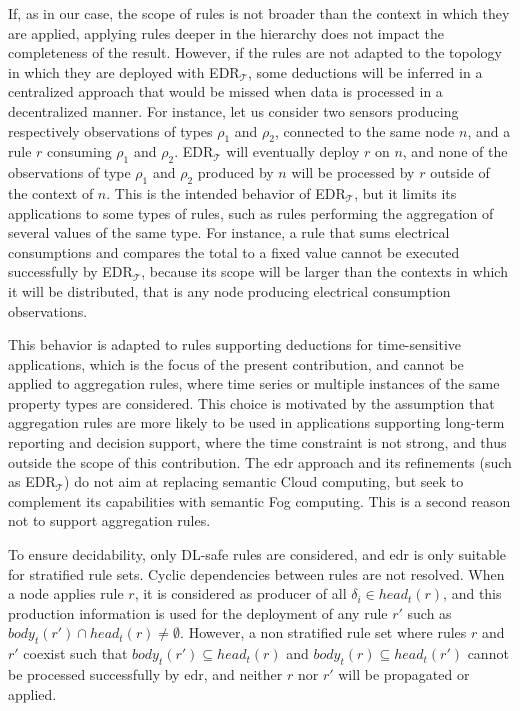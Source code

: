 \documentclass[sw]{iosart2x}
\newcommand{\edrt}{EDR$_{\mathcal{T}}$\xspace}
\begin{document}
If, as in our case, the scope of rules is not broader than the context in which they are applied, applying rules deeper in the hierarchy does not impact the completeness of the result.
However, if the rules are not adapted to the topology in which they are deployed with \edrt, some deductions will be inferred in a centralized approach that would be missed when data is processed in a decentralized manner. 
For instance, let us consider two sensors producing respectively observations of types $\rho_1$ and $\rho_2$, connected to the same node $n$, and a rule $r$ consuming $\rho_1$ and $\rho_2$.
\edrt will eventually deploy $r$ on $n$, and none of the observations of type $\rho_1$ and $\rho_2$ produced by $n$ will be processed by $r$ outside of the context of $n$.
This is the intended behavior of \edrt, but it limits its applications to some types of rules, such as rules performing the aggregation of several values of the same type.
For instance, a rule that sums electrical consumptions and compares the total to a fixed value cannot be executed successfully by \edrt, because its scope will be larger than the contexts in which it will be distributed, that is any node producing electrical consumption observations.

This behavior is adapted to rules supporting deductions for time-sensitive applications, which is the focus of the present contribution, and cannot be applied to aggregation rules, where time series or multiple instances of the same property types are considered.
This choice is motivated by the assumption that aggregation rules are more likely to be used in applications supporting long-term reporting and decision support, where the time constraint is not strong, and thus outside the scope of this contribution.
The \gls{edr} approach and its refinements (such as \edrt) do not aim at replacing semantic Cloud computing, but seek to complement its capabilities with semantic Fog computing. 
This is a second reason not to support aggregation rules.

To ensure decidability, only DL-safe rules are considered, and \gls{edr} is only suitable for stratified rule sets. 
Cyclic dependencies between rules are not resolved.
When a node applies rule $r$, it is considered as producer of all $\delta_i \in head_t(r)$, and this production information is used for the deployment of any rule $r'$ such as $body_t(r')\cap head_t(r)\neq \emptyset$.
However, a non stratified rule set where rules $r$ and $r'$ coexist such that $body_t(r')\subseteq head_t(r)$ and $body_t(r)\subseteq head_t(r')$ cannot be processed successfully by \gls{edr}, and neither $r$ nor $r'$ will be propagated or applied.
\end{document}
